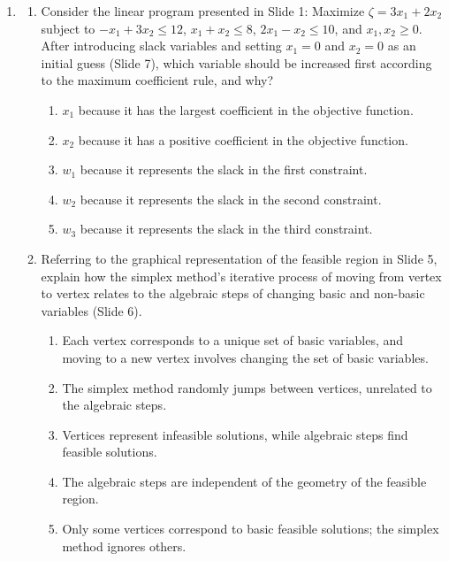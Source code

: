 \documentclass{article}%
\begin{document}
\begin{enumerate}
\begin{enumerate}
\item Pivoting involves calculating the inverse of the coefficient matrix.%
\end{enumerate}%
\vspace{1em}%
\item%
\begin{enumerate}%
\item Consider the linear program presented in Slide 1: Maximize $\zeta = 3x_1 + 2x_2$ subject to $-x_1 + 3x_2 \le 12$, $x_1 + x_2 \le 8$, $2x_1 - x_2 \le 10$, and $x_1, x_2 \ge 0$.  After introducing slack variables and setting $x_1 = 0$ and $x_2 = 0$ as an initial guess (Slide 7), which variable should be increased first according to the maximum coefficient rule, and why?%
\begin{enumerate}%
\item $x_1$ because it has the largest coefficient in the objective function.%
\item $x_2$ because it has a positive coefficient in the objective function.%
\item $w_1$ because it represents the slack in the first constraint.%
\item $w_2$ because it represents the slack in the second constraint.%
\item $w_3$ because it represents the slack in the third constraint.%
\end{enumerate}%
\vspace{0.5em}%
\item Referring to the graphical representation of the feasible region in Slide 5, explain how the simplex method's iterative process of moving from vertex to vertex relates to the algebraic steps of changing basic and non-basic variables (Slide 6).%
\begin{enumerate}%
\item Each vertex corresponds to a unique set of basic variables, and moving to a new vertex involves changing the set of basic variables.%
\item The simplex method randomly jumps between vertices, unrelated to the algebraic steps.%
\item Vertices represent infeasible solutions, while algebraic steps find feasible solutions.%
\item The algebraic steps are independent of the geometry of the feasible region.%
\item Only some vertices correspond to basic feasible solutions; the simplex method ignores others.%
\end{enumerate}%

\end{enumerate}
\end{enumerate}
\end{document}
